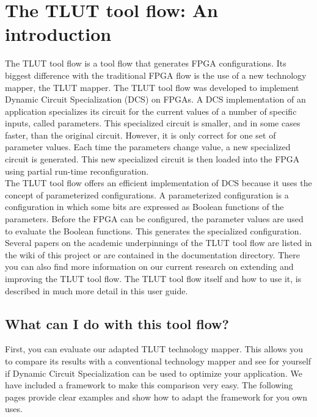 \documentclass[a4paper,oneside]{memoir}
\begin{document}
\let\clearforchapter\par %
\chapter{The TLUT tool flow: An introduction}

The TLUT tool flow is a tool flow that generates FPGA configurations. Its biggest difference with the traditional FPGA flow is the use of a new technology mapper, the TLUT mapper. The TLUT tool flow was developed to implement Dynamic Circuit Specialization (DCS) on FPGAs. A DCS implementation of an application specializes its circuit for the current values of a number of specific inputs, called parameters. This specialized circuit is smaller, and in some cases faster, than the original circuit. However, it is only correct for one set of parameter values. Each time the parameters change value, a new specialized circuit is generated. This new specialized circuit is then loaded into the FPGA using partial run-time reconfiguration.\\

The TLUT tool flow offers an efficient implementation of DCS because it uses the concept of parameterized configurations. A parameterized configuration is a configuration in which some bits are expressed as Boolean functions of the parameters. Before the FPGA can be configured, the parameter values are used to evaluate the Boolean functions. This generates the specialized configuration. Several papers on the academic underpinnings of the TLUT tool flow are listed in the wiki of this project or are contained in the documentation directory. There you can also find more information on our current research on extending and improving the TLUT tool flow. The TLUT tool flow itself and how to use it, is described in much more detail in this user guide.

\section{What can I do with this tool flow?}
First, you can evaluate our adapted TLUT technology mapper. 
This  allows you to compare its results with a conventional technology mapper and see for yourself if Dynamic Circuit Specialization can be used to optimize your application. 
We have included a framework to make this comparison very easy. 
The following pages provide clear examples and show how to adapt the framework for you own uses.
\end{document}
